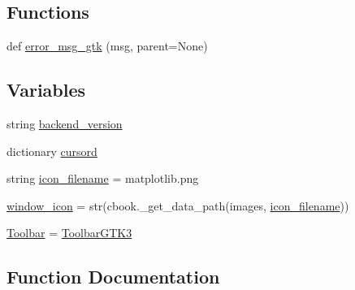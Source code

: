 \subsection*{Functions}
\begin{DoxyCompactItemize}
\item 
def \hyperlink{namespacematplotlib_1_1backends_1_1backend__gtk3_a418bd54b0a3d2451f344e2a7e8a06cd6}{error\+\_\+msg\+\_\+gtk} (msg, parent=None)
\end{DoxyCompactItemize}
\subsection*{Variables}
\begin{DoxyCompactItemize}
\item 
string \hyperlink{namespacematplotlib_1_1backends_1_1backend__gtk3_ab53f708498329c28623d5cbf2a31aeec}{backend\+\_\+version}
\item 
dictionary \hyperlink{namespacematplotlib_1_1backends_1_1backend__gtk3_a379e8d248b3abfc3587c48fb1f1571d9}{cursord}
\item 
string \hyperlink{namespacematplotlib_1_1backends_1_1backend__gtk3_a77525c76e1f137bd35eb0b4faca11603}{icon\+\_\+filename} = \textquotesingle{}matplotlib.\+png\textquotesingle{}
\item 
\hyperlink{namespacematplotlib_1_1backends_1_1backend__gtk3_a38f8918379cdf9b09276099da8680253}{window\+\_\+icon} = str(cbook.\+\_\+get\+\_\+data\+\_\+path(\textquotesingle{}images\textquotesingle{}, \hyperlink{namespacematplotlib_1_1backends_1_1backend__gtk3_a77525c76e1f137bd35eb0b4faca11603}{icon\+\_\+filename}))
\item 
\hyperlink{namespacematplotlib_1_1backends_1_1backend__gtk3_add286d329be46619f7fc9e8bc2e91f83}{Toolbar} = \hyperlink{classmatplotlib_1_1backends_1_1backend__gtk3_1_1ToolbarGTK3}{Toolbar\+G\+T\+K3}
\end{DoxyCompactItemize}


\subsection{Function Documentation}
\mbox{\label{namespacematplotlib_1_1backends_1_1backend__gtk3_a418bd54b0a3d2451f344e2a7e8a06cd6}} 
